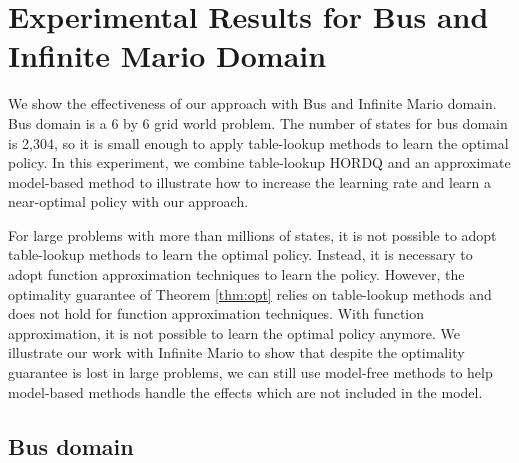 
\chapter{Experimental Results for Bus and Infinite Mario Domain }

We show the effectiveness of our approach with 
Bus and Infinite Mario domain.
Bus domain is a 6 by 6 grid world problem. 
The number of states for bus domain is
2,304, so it is small enough to apply table-lookup methods to learn
the optimal policy. In this experiment, we combine table-lookup HORDQ and an approximate model-based method 
to illustrate how to increase the learning rate and learn a near-optimal policy with our approach.

For large problems with more than millions of states, it is not possible to adopt
table-lookup methods to learn the optimal policy.
Instead, it is necessary to adopt function approximation techniques to learn the policy.
However, the optimality guarantee of Theorem \ref{thm:opt} relies on table-lookup methods and 
does not hold for function approximation techniques.
With function approximation, it is not possible to learn the optimal policy anymore.
We illustrate our work with Infinite Mario to show that despite the optimality guarantee is lost in
large problems, we can still use model-free methods to help model-based methods handle the effects which
are not included in the model. 



\section{Bus domain}
\label{se:domain}

